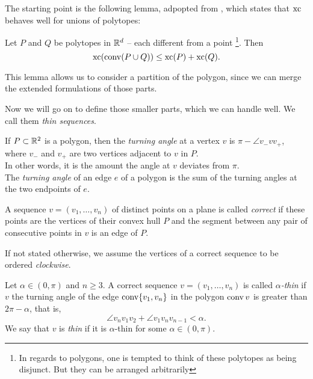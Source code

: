 The starting point is the following lemma, adpopted from \cite[Proposition 3.1.1]{weltge2015sizes}, which states that $\operatorname{xc}$ behaves well for unions of polytopes:
\begin{lemma}\label{lemma:union}
  Let $P$ and $Q$ be polytopes in $\mathbb{R}^d$ -- each different from a point \footnote{In regards to polygons, one is tempted to think of these polytopes as being disjunct. But they can be arranged arbitrarily}. Then $$\operatorname{xc}(\operatorname{conv}(P \cup Q)) \leq \operatorname{xc}(P) + \operatorname{xc}(Q) .$$
\end{lemma}

This lemma allows us to consider a partition of the polygon, since we can merge the extended formulations of those parts.

Now we will go on to define those smaller parts, which we can handle well. We call them \emph{thin sequences}.

\begin{definition}
  If $P\subset\mathbb{R}^2$ is a polygon, then the \textit{turning angle} at a vertex $v$ is $\pi-\angle v_-vv_+$, where $v_-$ and $v_+$ are two vertices adjacent to $v$ in $P$. \\
  In other words, it is the amount the angle at $v$ deviates from $\pi$. \\
  The \textit{turning angle} of an edge $e$ of a polygon is the sum of the turning angles at the two endpoints of $e$.
\end{definition}

\begin{definition}
  A sequence $v=(v_1,\ldots,v_n)$ of distinct points on a plane is called \textit{correct} if these points are the vertices of their convex hull $P$ and the segment between any pair of consecutive points in $v$ is an edge of $P$.
\end{definition}

If not stated otherwise, we assume the vertices of a correct sequence to be ordered \emph{clockwise}.

\begin{definition}
  Let $\alpha\in(0,\pi)$ and $n \geq 3$. A correct sequence $v=(v_1,\ldots,v_n)$ is called $\alpha$\textit{-thin} if $v$ the turning angle of the edge $\operatorname{conv}\{v_1, v_n\}$ in the polygon $\operatorname{conv} v$ is greater than $2\pi-\alpha$, that is, $$\angle v_n v_1 v_2+\angle v_1v_nv_{n-1}<\alpha.$$ We say that $v$ is \textit{thin} if it is $\alpha$-thin for some $\alpha\in(0,\pi)$.
\end{definition}

